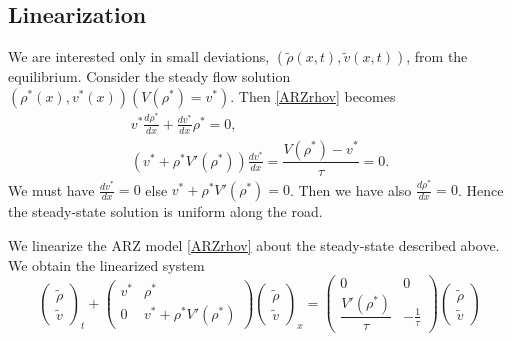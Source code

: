 \documentclass[preprint]{elsarticle}
\begin{document}
\subsection{Linearization}
We are interested only in small deviations, $(\tilde{\rho}(x,t), \tilde{v}(x,t))$, from the equilibrium. Consider the steady flow solution $(\rho^*(x),v^*(x))(V(\rho^*) = v^*)$. Then \eqref{ARZrhov} becomes
\begin{align}
v^* \frac{d\rho^*}{dx} + \frac{dv^*}{dx}\rho^* = 0, \\
\left( v^* + \rho^* V'( \rho^*) \right)\frac{dv^*}{dx} = \dfrac{V(\rho^*) - v^*}{\tau} = 0.
\end{align}
We must have $\frac{dv^*}{dx}=0$ else $v^* + \rho^* V'( \rho^*) = 0$. Then we have also $\frac{d\rho^*}{dx} = 0$. Hence the steady-state solution is uniform along the road. 

We linearize the ARZ model \eqref{ARZrhov} about the steady-state described above. We obtain the linearized system
\begin{equation} \label{rhovlin}
\begin{pmatrix}
\tilde{\rho} \\ \tilde{v}
\end{pmatrix}_t
+ \begin{pmatrix}
v^* & \rho^* \\
0 & v^* + \rho^* V' ( \rho^*) 
\end{pmatrix}
\begin{pmatrix}
\tilde{\rho} \\ \tilde{v}
\end{pmatrix}_x = 
\begin{pmatrix}
0 & 0 \\
\dfrac{V' (\rho^*)}{\tau} & -\frac{1}{\tau}
\end{pmatrix}
\begin{pmatrix}
\tilde{\rho} \\ \tilde{v}
\end{pmatrix}
\end{equation}
\end{document}
